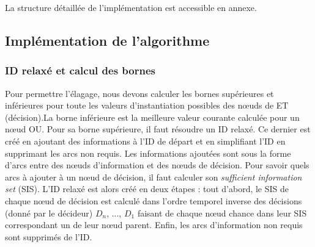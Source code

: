 \documentclass[12pt]{article}
\begin{document}
La structure détaillée de l'implémentation est accessible en annexe.

\subsection{Implémentation de l'algorithme}

\subsubsection{ID relaxé et calcul des bornes}
Pour permettre l'élagage, nous devons calculer les bornes supérieures et inférieures pour toute les valeurs d'instantiation possibles des nœuds de ET (décision).La borne inférieure est la meilleure valeur courante calculée pour un nœud OU.
Pour sa borne supérieure, il faut résoudre un ID relaxé. 
Ce dernier est créé en ajoutant des informations à l'ID de départ et en simplifiant l'ID en supprimant les arcs non requis. 
\bigbreak
Les informations ajoutées sont sous la forme d'arcs entre des nœuds d'information et des nœuds de décision. Pour savoir quels arcs à ajouter à un nœud de décision, il faut calculer son \textit{sufficient information set} (SIS).
\bigbreak
L'ID relaxé est alors créé en deux étapes :
tout d'abord, le SIS de chaque nœud de décision est calculé dans l'ordre temporel inverse des décisions (donné par le décideur) $D_n$, ..., $D_1$ faisant de chaque nœud chance dans leur SIS correspondant un de leur nœud parent.
Enfin, les arcs d'information non requis sont supprimés de l'ID.
\end{document}
